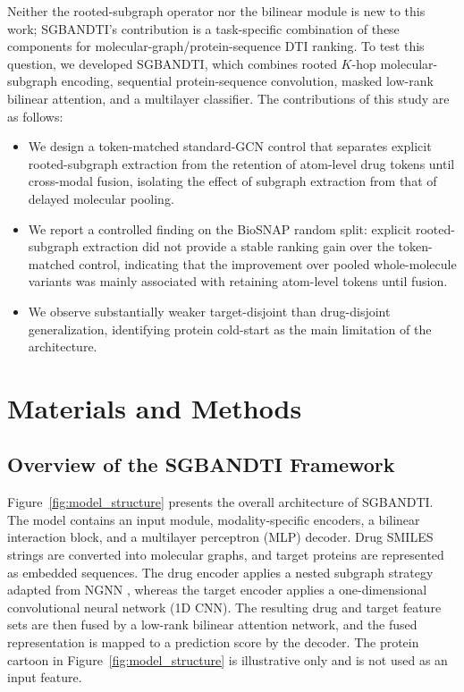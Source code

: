\documentclass[computers,article,submit,moreauthors]{Definitions/mdpi}
\begin{document}
Neither the rooted-subgraph operator nor the bilinear module is new to this work; SGBANDTI's contribution is a task-specific combination of these components for molecular-graph/protein-sequence DTI ranking. To test this question, we developed SGBANDTI, which combines rooted $K$-hop molecular-subgraph encoding, sequential protein-sequence convolution, masked low-rank bilinear attention, and a multilayer classifier. The contributions of this study are as follows:
\begin{itemize}
\item We design a token-matched standard-GCN control that separates explicit rooted-subgraph extraction from the retention of atom-level drug tokens until cross-modal fusion, isolating the effect of subgraph extraction from that of delayed molecular pooling.
\item We report a controlled finding on the BioSNAP random split: explicit rooted-subgraph extraction did not provide a stable ranking gain over the token-matched control, indicating that the improvement over pooled whole-molecule variants was mainly associated with retaining atom-level tokens until fusion.
\item We observe substantially weaker target-disjoint than drug-disjoint generalization, identifying protein cold-start as the main limitation of the architecture.
\end{itemize}

\section{Materials and Methods}
\subsection{Overview of the SGBANDTI Framework}
Figure~\ref{fig:model_structure} presents the overall architecture of SGBANDTI. The model contains an input module, modality-specific encoders, a bilinear interaction block, and a multilayer perceptron (MLP) decoder. Drug SMILES strings are converted into molecular graphs, and target proteins are represented as embedded sequences. The drug encoder applies a nested subgraph strategy adapted from NGNN \citep{zhang2021ngnn}, whereas the target encoder applies a one-dimensional convolutional neural network (1D CNN). The resulting drug and target feature sets are then fused by a low-rank bilinear attention network, and the fused representation is mapped to a prediction score by the decoder. The protein cartoon in Figure~\ref{fig:model_structure} is illustrative only and is not used as an input feature.
\end{document}
